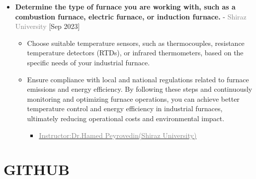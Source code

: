 \documentclass[10pt,a4paper,sans]{moderncv} %
\begin{document}
     	\begin{itemize}
		\item {}  \textbf{Determine the type of furnace you are working with, such as a combustion furnace, electric furnace, or induction furnace.} - \textcolor{gray}{Shiraz University}    \hfill\textcolor{gray}{}   [Sep 2023]

  \vspace{0.3 em} 
  
  \begin{itemize}
			\item {}  Choose suitable temperature sensors, such as thermocouples, resistance temperature detectors (RTDs), or infrared thermometers, based on the specific needs of your industrial furnace. 

      	    \item {}  Ensure compliance with local and national regulations related to furnace emissions and energy efficiency. By following these steps and continuously monitoring and optimizing furnace operations, you can achieve better temperature control and energy efficiency in industrial furnaces, ultimately reducing operational costs and environmental impact.
			\begin{itemize} 
				\item\href{https://scholar.google.com/citations?hl=en&user=KG__hzQAAAAJ}{\textcolor{gray}{Instructor:Dr.Hamed Peyrovedin(Shiraz University)}}
			\end{itemize}
			

			
		\end{itemize}
	\end{itemize}

 

    \section{GITHUB} 
    
\end{document}
